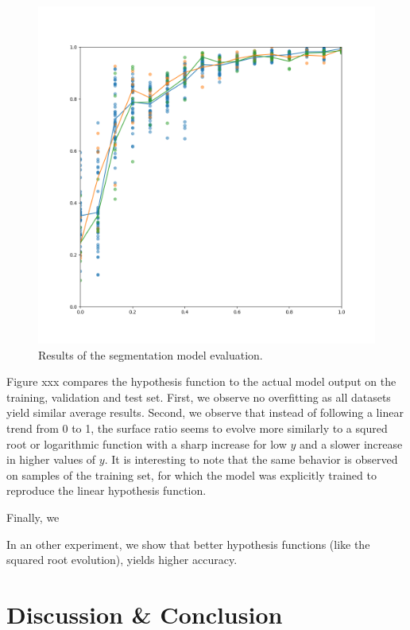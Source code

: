 \documentclass[10pt,twocolumn,letterpaper]{article}
\begin{document}
\begin{figure}[h]
	\centering
	\includegraphics[width=0.9\linewidth]{"./figures/Figure10"}
	\caption{
		Results of the segmentation model evaluation.
	}
\end{figure}

Figure xxx compares the hypothesis function to the actual model output on the training, validation and test set.
First, we observe no overfitting as all datasets yield similar average results.
Second, we observe that instead of following a linear trend from 0 to 1, 
the surface ratio seems to evolve more similarly to a squred root or logarithmic function
with a sharp increase for low $y$ and a slower increase in higher values of $y$.
It is interesting to note that the same behavior is observed on samples of the training set, 
for which the model was explicitly trained to reproduce the linear hypothesis function.

Finally, we 

In an other experiment, we show that better hypothesis functions (like the squared root evolution), 
yields higher accuracy.

\section{Discussion \& Conclusion}

\end{document}

